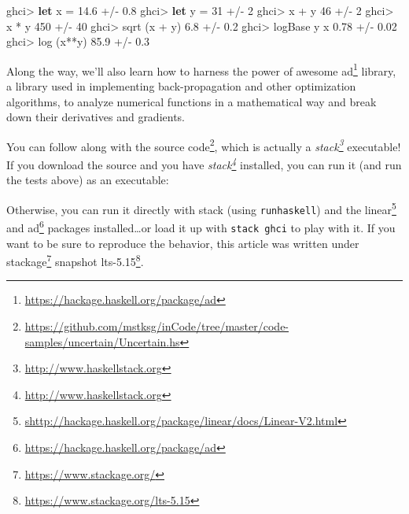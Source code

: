 \documentclass[]{article}
\newenvironment{Shaded}{}{}
\newcommand{\DecValTok}[1]{\textcolor[rgb]{0.25,0.63,0.44}{#1}}
\newcommand{\ExtensionTok}[1]{#1}
\newcommand{\FloatTok}[1]{\textcolor[rgb]{0.25,0.63,0.44}{#1}}
\newcommand{\FunctionTok}[1]{\textcolor[rgb]{0.02,0.16,0.49}{#1}}
\newcommand{\KeywordTok}[1]{\textcolor[rgb]{0.00,0.44,0.13}{\textbf{#1}}}
\newcommand{\NormalTok}[1]{#1}
\newcommand{\OperatorTok}[1]{\textcolor[rgb]{0.40,0.40,0.40}{#1}}
\newcommand{\OtherTok}[1]{\textcolor[rgb]{0.00,0.44,0.13}{#1}}
\renewcommand{\href}[2]{#2\footnote{\url{#1}}}
\begin{document}
\begin{Shaded}
\begin{Highlighting}[]
\NormalTok{ghci}\OperatorTok{>} \KeywordTok{let}\NormalTok{ x }\OtherTok{=} \FloatTok{14.6} \OperatorTok{+/{-}} \FloatTok{0.8}
\NormalTok{ghci}\OperatorTok{>} \KeywordTok{let}\NormalTok{ y }\OtherTok{=} \DecValTok{31}   \OperatorTok{+/{-}} \DecValTok{2}
\NormalTok{ghci}\OperatorTok{>}\NormalTok{ x }\OperatorTok{+}\NormalTok{ y}
\DecValTok{46} \OperatorTok{+/{-}} \DecValTok{2}
\NormalTok{ghci}\OperatorTok{>}\NormalTok{ x }\OperatorTok{*}\NormalTok{ y}
\DecValTok{450} \OperatorTok{+/{-}} \DecValTok{40}
\NormalTok{ghci}\OperatorTok{>} \FunctionTok{sqrt}\NormalTok{ (x }\OperatorTok{+}\NormalTok{ y)}
\FloatTok{6.8} \OperatorTok{+/{-}} \FloatTok{0.2}
\NormalTok{ghci}\OperatorTok{>} \FunctionTok{logBase}\NormalTok{ y x}
\FloatTok{0.78} \OperatorTok{+/{-}} \FloatTok{0.02}
\NormalTok{ghci}\OperatorTok{>} \FunctionTok{log}\NormalTok{ (x}\OperatorTok{**}\NormalTok{y)}
\FloatTok{85.9} \OperatorTok{+/{-}} \FloatTok{0.3}
\end{Highlighting}
\end{Shaded}

Along the way, we'll also learn how to harness the power of awesome
\href{https://hackage.haskell.org/package/ad}{ad} library, a library used in
implementing back-propagation and other optimization algorithms, to analyze
numerical functions in a mathematical way and break down their derivatives and
gradients.

You can follow along with
\href{https://github.com/mstksg/inCode/tree/master/code-samples/uncertain/Uncertain.hs}{the
source code}, which is actually a
\emph{\href{http://www.haskellstack.org}{stack}} executable! If you download the
source and you have \emph{\href{http://www.haskellstack.org}{stack}} installed,
you can run it (and run the tests above) as an executable:

\begin{Shaded}
\end{Shaded}

Otherwise, you can run it directly with stack (using \texttt{runhaskell}) and
the
\href{shttp://hackage.haskell.org/package/linear/docs/Linear-V2.html}{linear}
and \href{https://hackage.haskell.org/package/ad}{ad} packages
installed\ldots or load it up with \texttt{stack\ ghci} to play with it. If you
want to be sure to reproduce the behavior, this article was written under
\href{https://www.stackage.org/}{stackage} snapshot
\href{https://www.stackage.org/lts-5.15}{lts-5.15}.
\end{document}

